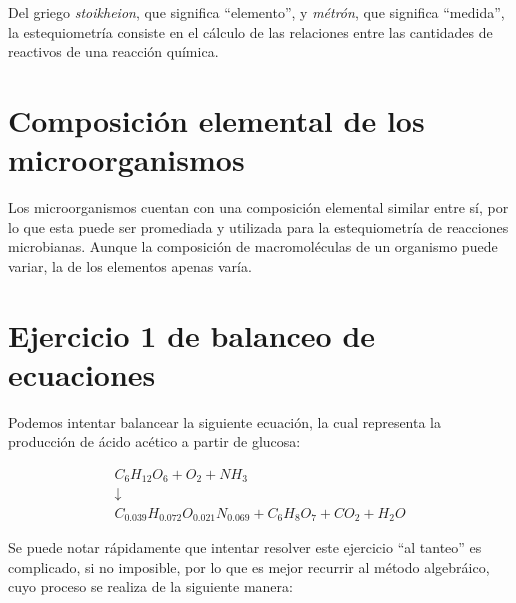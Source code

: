 
Del griego \textit{stoikheion}, que significa ``elemento'', y \textit{métrón}, que significa ``medida'', la estequiometría consiste en el cálculo de las relaciones entre las cantidades de reactivos de una reacción química.

\section{Composición elemental de los microorganismos}

Los microorganismos cuentan con una composición elemental similar entre sí, por lo que esta puede ser promediada y utilizada para la estequiometría de reacciones microbianas.
Aunque la composición de macromoléculas de un organismo puede variar, la de los elementos apenas varía.


    \marginpar{\begin{minipage}{\marginparwidth}
        
    \end{minipage}}


\section{Ejercicio 1 de balanceo de ecuaciones}

Podemos intentar balancear la siguiente ecuación, la cual representa la producción de ácido acético a partir de glucosa:

\begin{gather*}
    C_{6}H_{12}O_{6} + O_{2} + NH_{3} 
    \\
    \downarrow
    \\
    C_{0.039}H_{0.072}O_{0.021}N_{0.069} + C_{6}H_{8}O_{7} + CO_{2} + H_{2}O
\end{gather*}

Se puede notar rápidamente que intentar resolver este ejercicio ``al tanteo'' es complicado, si no imposible, por lo que es mejor recurrir al método algebráico, cuyo proceso se realiza de la siguiente manera:

